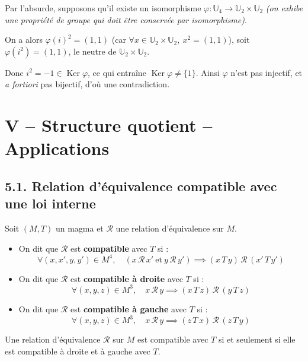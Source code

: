 \documentclass[a4paper,11pt]{article}
\newcommand{\U}{\mathbb{U}}
\DeclareMathOperator{\Ker}{Ker}
\newcommand{\mot}[1]{\textcolor{bordeaux}{\textbf{#1}}}
\begin{document}
\begin{exemples}
\begin{enumerate}
  Par l'absurde, supposons qu'il existe un isomorphisme $\varphi : \U_4 \to \U_2 \times \U_2$ \textit{(on exhibe une propriété de groupe qui doit être conservée par isomorphisme)}.
  
  On a alors $\varphi(i)^2 = (1, 1)$ (car $\forall x \in \U_2 \times \U_2, \ x^2 = (1, 1)$), soit $\varphi(i^2) = (1, 1)$, le neutre de $\U_2 \times \U_2$.
  
  Donc $i^2 = -1 \in \Ker \varphi$, ce qui entraîne $\Ker \varphi \neq \{1\}$. Ainsi $\varphi$ n'est pas injectif, et \textit{a fortiori} pas bijectif, d'où une contradiction.
\end{enumerate}
\end{exemples}

\newpage
\section{V -- Structure quotient -- Applications}

\subsection{5.1. Relation d'équivalence compatible avec une loi interne}

\begin{definition}
Soit $(M, T)$ un magma et $\mathcal{R}$ une relation d'équivalence sur $M$.
\begin{itemize}
    \item On dit que $\mathcal{R}$ est \mot{compatible} avec $T$ si :
    \[
    \forall (x, x', y, y') \in M^4, \quad (x \, \mathcal{R} \, x' \ \text{et} \ y \, \mathcal{R} \, y') \implies (x \, T \, y) \, \mathcal{R} \, (x' \, T \, y')
    \]
    \item On dit que $\mathcal{R}$ est \mot{compatible à droite} avec $T$ si :
    \[
    \forall (x, y, z) \in M^3, \quad x \, \mathcal{R} \, y \implies (x \, T \, z) \, \mathcal{R} \, (y \, T \, z)
    \]
    \item On dit que $\mathcal{R}$ est \mot{compatible à gauche} avec $T$ si :
    \[
    \forall (x, y, z) \in M^3, \quad x \, \mathcal{R} \, y \implies (z \, T \, x) \, \mathcal{R} \, (z \, T \, y)
    \]
\end{itemize}
\end{definition}

\begin{proposition}
Une relation d'équivalence $\mathcal{R}$ sur $M$ est compatible avec $T$ si et seulement si elle est compatible à droite et à gauche avec $T$.
\end{proposition}
\end{document}
